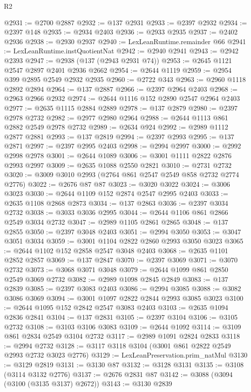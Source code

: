 \begin{lexlean}{R2}
\begin{coremodule}
@2931 := @2700 @2887
@2932 := @137 @2931
@2933 := @2397 @2932
@2934 := @2397 @148
@2935 := @2934 @2403
@2936 := @2933 @2935
@2937 := @2402 @2936
@2938 := @2930 @2937
@2940 := LexLeanRuntime.remainder @66
@2941 := LexLeanRuntime.instQuotientNat
@2942 := @2940 @2941
@2943 := @2942 @2393
@2947 := @2938 (@137 (@2943 @2931 @74))
@2953 := @2645 @1121 @2547 @2897 @2401 @2936 @2662
@2954 := @2644 @1119
@2959 := @2954 @399 @2895 @2549 @2932 @2935
@2960 := @2722 @343
@2963 := @2960 @1118 @2892 @2894
@2964 := @137 @2887
@2966 := @2397 @2964 @2403
@2968 := @2963 @2966 @2932
@2974 := @2644 @1116 @152 @2890 @2547 @2964 @2403
@2977 := @2635 @1115 @2884 @2889
@2978 := @137 @2879
@2980 := @2397 @2978 @2732
@2982 := @2977 @2980 @2964
@2988 := @2644 @1113 @861 @2882 @2549 @2978 @2732
@2989 := @2634 @924
@2992 := @2989 @1112 @2877 @2881
@2993 := @137 @2819
@2994 := @2397 @2993
@2995 := @137 @2871
@2997 := @2397 @2995 @2403
@2998 := @2994 @2997
@3000 := @2992 @2998 @2978
@3001 := @2644 @1089
@3006 := @3001 @1111 @2822 @2876 @2993 @2997
@3009 := @2635 @1088 @2550 @2821
@3010 := @2731 @2732
@3020 := @3009 @3010 @2993 (@2764 @861 @2547 @2549 @858 @2732 @2774 @2776)
@3022 := @2676 @87 @87
@3023 := @3020 @3022
@3024 := @3006 @3023
@3030 := @2644 @1109 @152 @2874 @2547 @2995 @2403
@3033 := @2635 @1108 @2868 @2873
@3034 := @137 @2863
@3036 := @2397 @3034 @2732
@3038 := @3033 @3036 @2995
@3044 := @2644 @1106 @861 @2866 @2549 @3034 @2732
@3047 := @2989 @1105 @2861 @2865
@3048 := @137 @2855
@3050 := @2397 @3048 @2403
@3051 := @2994 @3050
@3053 := @3047 @3051 @3034
@3059 := @3001 @1104 @2822 @2860 @2993 @3050 @3023
@3065 := @2644 @1102 @152 @2858 @2547 @3048 @2403
@3068 := @2635 @1101 @2852 @2857
@3069 := @137 @2847
@3070 := @2397 @3069
@3071 := @3070 @2732
@3073 := @3068 @3071 @3048
@3079 := @2644 @1099 @861 @2850 @2549 @3069 @2732
@3082 := @2989 @1098 @2845 @2849
@3083 := @137 @2839
@3085 := @2397 @3083 @2403
@3086 := @2994 @3085
@3088 := @3082 @3086 @3069
@3094 := @3001 @1097 @2822 @2844 @2993 @3085 @3023
@3100 := @2644 @1095 @152 @2842 @2547 @3083 @2403
@3103 := @2635 @1094 @2836 @2841
@3104 := @137 @2831
@3105 := @2397 @3104
@3106 := @3105 @2732
@3108 := @3103 @3106 @3083
@3109 := @2644 @1092
@3114 := @3109 @861 @2834 @2549 @3104 @2732
@3117 := @2989 @1091 @2824 @2833
@3118 := @2994 @2732
@3128 := @3117 @3118 @3104 (@3001 @861 @2822 @2549 @2993 @2732 @3023 @2776)
@3129 := LexLeanPreservation.prim_natMul
@3130 := @3129 @2819
@3131 := @3130 @87
@3132 := @3128 @3131
@3135 := @3108 (@3114 @3132 @2776)
@3137 := @2676 @2831 @87
@3142 := @3088 (@3094 (@3100 (@3135 @3137) @2672))
@3143 := @3130 @2839

\end{coremodule}
\end{lexlean}
